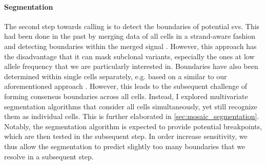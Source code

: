 \paragraph{Segmentation}
The second step towards \sv calling is to detect the boundaries of potential
\acp{sv}. This had been done in the past by merging data of all cells in a
strand-aware fashion and detecting boundaries within the merged signal
\citep{Sanders2016}. However, this approach has the disadvantage that it can
mask subclonal variants, especially the ones at low allele frequency that we
are particularly interested in. Boundaries have also been determined within
single cells separately, e.g. based on a \hmm similar to our aforementioned approach \citep{Bakker2016}. However, this
leads to the subsequent challenge of forming consensus boundaries across all
cells. Instead, I explored multivariate segmentation algorithms that consider
all cells simultaneously, yet still recognize them as individual cells. This is
further elaborated in \cref{sec:mosaic_segmentation}. Notably, the segmentation
algorithm is expected to provide potential \sv breakpoints, which are then
tested in the subsequent step. In order increase sensitivity, we thus allow the
segmentation to predict slightly too many boundaries that we resolve in a subsequent step.


